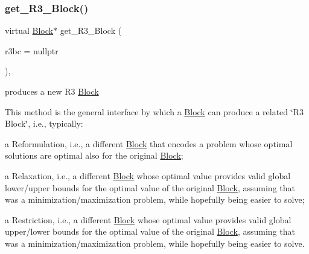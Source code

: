 \subsubsection{\texorpdfstring{get\+\_\+\+R3\+\_\+\+Block()}{get\_R3\_Block()}}
{\footnotesize\ttfamily virtual \mbox{\hyperlink{class_s_m_spp__di__unipi__it_1_1_block}{Block}}$\ast$ get\+\_\+\+R3\+\_\+\+Block (\begin{DoxyParamCaption}\item[{\mbox{\hyperlink{class_s_m_spp__di__unipi__it_1_1_configuration}{Configuration}} $\ast$}]{r3bc = {\ttfamily nullptr} }\end{DoxyParamCaption})\hspace{0.3cm}{\ttfamily [inline]}, {\ttfamily [virtual]}}



produces a new R3 \mbox{\hyperlink{class_s_m_spp__di__unipi__it_1_1_block}{Block}} 

This method is the general interface by which a \mbox{\hyperlink{class_s_m_spp__di__unipi__it_1_1_block}{Block}} can produce a related \char`\"{}\+R3 Block\char`\"{}, i.\+e., typically\+:


\begin{DoxyItemize}
\item a Reformulation, i.\+e., a different \mbox{\hyperlink{class_s_m_spp__di__unipi__it_1_1_block}{Block}} that encodes a problem whose optimal solutions are optimal also for the original \mbox{\hyperlink{class_s_m_spp__di__unipi__it_1_1_block}{Block}};
\item a Relaxation, i.\+e., a different \mbox{\hyperlink{class_s_m_spp__di__unipi__it_1_1_block}{Block}} whose optimal value provides valid global lower/upper bounds for the optimal value of the original \mbox{\hyperlink{class_s_m_spp__di__unipi__it_1_1_block}{Block}}, assuming that was a minimization/maximization problem, while hopefully being easier to solve;
\item a Restriction, i.\+e., a different \mbox{\hyperlink{class_s_m_spp__di__unipi__it_1_1_block}{Block}} whose optimal value provides valid global upper/lower bounds for the optimal value of the original \mbox{\hyperlink{class_s_m_spp__di__unipi__it_1_1_block}{Block}}, assuming that was a minimization/maximization problem, while hopefully being easier to solve.
\end{DoxyItemize}

